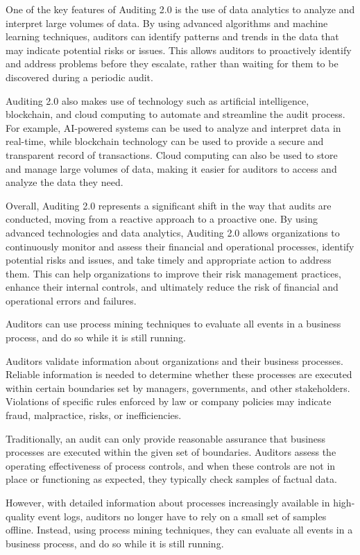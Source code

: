 One of the key features of Auditing 2.0 is the use of data analytics to analyze and interpret large volumes of data. By using advanced algorithms and machine learning techniques, auditors can identify patterns and trends in the data that may indicate potential risks or issues. This allows auditors to proactively identify and address problems before they escalate, rather than waiting for them to be discovered during a periodic audit.

Auditing 2.0 also makes use of technology such as artificial intelligence, blockchain, and cloud computing to automate and streamline the audit process. For example, AI-powered systems can be used to analyze and interpret data in real-time, while blockchain technology can be used to provide a secure and transparent record of transactions. Cloud computing can also be used to store and manage large volumes of data, making it easier for auditors to access and analyze the data they need.

Overall, Auditing 2.0 represents a significant shift in the way that audits are conducted, moving from a reactive approach to a proactive one. By using advanced technologies and data analytics, Auditing 2.0 allows organizations to continuously monitor and assess their financial and operational processes, identify potential risks and issues, and take timely and appropriate action to address them. This can help organizations to improve their risk management practices, enhance their internal controls, and ultimately reduce the risk of financial and operational errors and failures.

Auditors can use process mining techniques to evaluate all events in a business process, and do so while it is still running.~\citep{5427384}

Auditors validate information about organizations and their business processes. Reliable information is needed to determine whether these processes are executed within certain boundaries set by managers, governments, and other stakeholders. Violations of specific rules enforced by law or company policies may indicate fraud, malpractice, risks, or inefficiencies.

Traditionally, an audit can only provide reasonable assurance that business processes are executed within the given set of boundaries. Auditors assess the operating effectiveness of process controls, and when these controls are not in place or functioning as expected, they typically check samples of factual data.

However, with detailed information about processes increasingly available in high-quality event logs, auditors no longer have to rely on a small set of samples offline. Instead, using process mining techniques, they can evaluate all events in a business process, and do so while it is still running.

